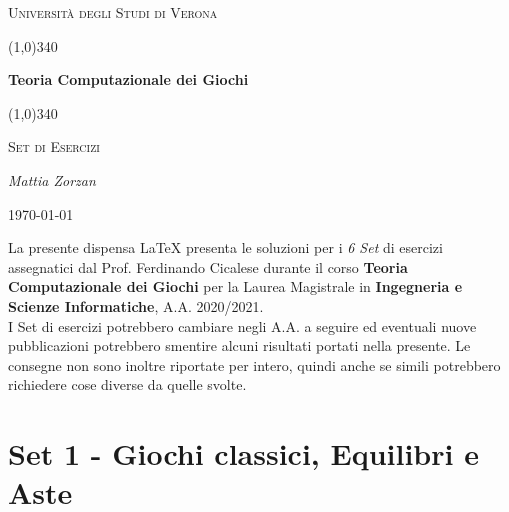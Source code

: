 \documentclass{article}
\begin{document}
    \clearpage

    \begin{titlepage}
        \centering
        \vspace*{\fill}
        {\scshape\LARGE Università degli Studi di Verona \par}
        \vspace{1.5cm}
        \line(1,0){340} \\
        {\huge\bfseries Teoria Computazionale dei Giochi \par}
        \line(1,0){340} \\
        \vspace{0.5cm}
        {\scshape\LARGE Set di Esercizi \par}
        \vspace{2cm}
        {\Large\itshape Mattia Zorzan \par}
        \vspace{1cm}

        \vspace{5cm}
        \vspace*{\fill}
        {\large \today \par}
    \end{titlepage}
    \thispagestyle{empty}
    \newpage
    \tableofcontents
    \thispagestyle{empty}
    \newpage
    La presente dispensa \LaTeX\; presenta le soluzioni per i \textit{6 Set} di esercizi assegnatici dal Prof. Ferdinando Cicalese durante il corso \textbf{Teoria Computazionale dei Giochi} per la Laurea Magistrale in \textbf{Ingegneria e Scienze Informatiche}, A.A. 2020/2021.\\
    I Set di esercizi potrebbero cambiare negli A.A. a seguire ed eventuali nuove pubblicazioni potrebbero smentire alcuni risultati portati nella presente. Le consegne non sono inoltre riportate per intero, quindi anche se simili potrebbero richiedere cose diverse da quelle svolte.
    \newpage
    \section{Set 1 - Giochi classici, Equilibri e Aste}
\end{document}
